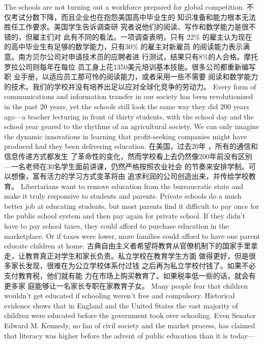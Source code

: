 \begin{paracol}{2}
The schools are not turning out a workforce prepared for
global competition.
\switchcolumn
不仅考试分数下降，而且企业也在抱怨美国高中毕业生的
知识准备和能力根本无法胜任工作要求。美国学生告诉调查研
究者说他们的阅读、写作和数学能力是很不错的，但雇主们对
此有不同的看法。一项调查表明，只有 22\% 的雇主认为现在
的高中毕业生有足够的数学能力，只有30\% 的雇主对新雇员
的阅读能力表示满意。南方贝尔公司对申请技术员的应聘者进
行测试，结果只有8\%的人合格。摩托罗拉公司则每年在每位
员工身上花1350美元培训基本技能。很多公司都重新编写职
业手册，以适应员工那可怜的阅读能力，或者采用一些不需要
阅读和数学能力的技术。我们的学校并没有培养出足以应对全球化竞争的劳动力。
\switchcolumn*
Every form of communications and information transfer in
our society has been revolutionized in the past 20 years, yet the
schools still look the same way they did 200 years ago---a
teacher lecturing in front of thirty students, with the school day
and the school year geared to the rhythms of an agricultural society. We can only imagine the dynamic innovations in learning
that profit-seeking companies might have produced had they
been delivering education.
\switchcolumn
在美国，过去20年 ，所有的通信和信息传递方式都发生
了革命性的变化，然而学校看上去仍然像200年前没有区别
---一名老师在30名学生面前讲课，仍然严格按照农业社会
的节奏来安排学制。可以想像，富有活力的学习方式变革将由
追求利润的公司创造出来，并传给学校教育。
\switchcolumn*
Libertarians want to remove education from the bureaucratic
state and make it truly responsive to students and parents. Private schools do a much better job at educating students, but
most parents find it difficult to pay once for the public school
system and then pay again for private school. If they didn't
have to pay school taxes, they could afford to purchase education in the marketplace. Or if taxes were lower, more families
could afford to have one parent educate children at home.
\switchcolumn
古典自由主义者希望将教育从官僚机制下的国家手里拿
走，让教育真正对学生和家长负责。私立学校在教育学生方面
做得更好，但是很多家长发现，很难在为公立学校体系付过钱
之后再为私立学校付钱了。如果不必支付教育税，他们就有能
力在市场上购买教育了。如果税率低一些的话，就会有更多家
庭能够让一名家长专职在家教育子女。
\switchcolumn*
Many people fear that children wouldn't get educated if
schooling weren't free and compulsory. Historical evidence
shows that in England and the United States the vast majority
of children were educated before the government took over
schooling. Even Senator Edward M. Kennedy, no fan of civil society and the market process, has claimed that literacy was
higher before the advent of public education than it is today---

\end{paracol}
